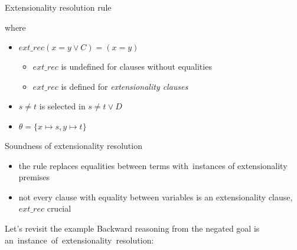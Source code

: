 \begin{frame}{Extensionality resolution rule}
  \begin{prooftree}
  \end{prooftree}

  where

  \begin{itemize}
  \item $ext\_rec(x = y \lor C) = (x = y)$
    
    \begin{itemize}
    \item $ext\_rec$ is undefined for clauses without equalities
    \item $ext\_rec$ is defined for \emph{extensionality clauses}
    \end{itemize}
    
  \item $s \neq t$ is selected in $s \neq t \lor D$
  \item $\theta = \{ x \mapsto s, y \mapsto t \}$
  \end{itemize}
\end{frame}

\begin{frame}{Soundness of extensionality resolution}
  \begin{prooftree}
  \end{prooftree}

  \begin{itemize}
  \item the rule replaces equalities between terms with~instances of extensionality premises
  \item not every clause with equality between variables is an extensionality clause, $ext\_rec$ crucial
  \end{itemize}

\end{frame}


\begin{frame}{Let's revisit the example}
  Backward reasoning from the negated goal is an~instance~of~extensionality~resolution:

  \begin{prooftree}
  \end{prooftree}
\end{frame}

